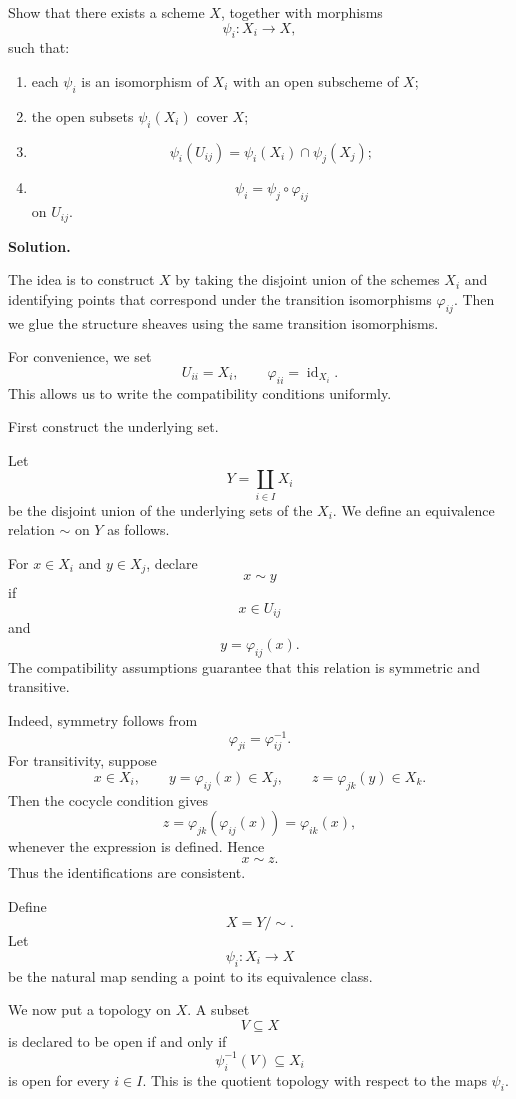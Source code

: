 \documentclass[12pt,a4paper]{article}
\theoremstyle{notespace}
\begin{document}
Show that there exists a scheme \(X\), together with morphisms
\[
\psi_i:X_i\to X,
\]
such that:

\begin{enumerate}[label=\textup{(\arabic*)}]
	\item each \(\psi_i\) is an isomorphism of \(X_i\) with an open subscheme of \(X\);
	
	\item the open subsets \(\psi_i(X_i)\) cover \(X\);
	
	\item
	\[
	\psi_i(U_{ij})
	=
	\psi_i(X_i)\cap \psi_j(X_j);
	\]
	
	\item
	\[
	\psi_i
	=
	\psi_j\circ \varphi_{ij}
	\]
	on \(U_{ij}\).
\end{enumerate}

\textbf{Solution.}

The idea is to construct \(X\) by taking the disjoint union of the schemes \(X_i\) and identifying points that correspond under the transition isomorphisms \(\varphi_{ij}\). Then we glue the structure sheaves using the same transition isomorphisms.

For convenience, we set
\[
U_{ii}=X_i,
\qquad
\varphi_{ii}=\operatorname{id}_{X_i}.
\]
This allows us to write the compatibility conditions uniformly.

First construct the underlying set.

Let
\[
Y=\coprod_{i\in I}X_i
\]
be the disjoint union of the underlying sets of the \(X_i\). We define an equivalence relation \(\sim\) on \(Y\) as follows.

For \(x\in X_i\) and \(y\in X_j\), declare
\[
x\sim y
\]
if
\[
x\in U_{ij}
\]
and
\[
y=\varphi_{ij}(x).
\]
The compatibility assumptions guarantee that this relation is symmetric and transitive.

Indeed, symmetry follows from
\[
\varphi_{ji}=\varphi_{ij}^{-1}.
\]
For transitivity, suppose
\[
x\in X_i,
\qquad
y=\varphi_{ij}(x)\in X_j,
\qquad
z=\varphi_{jk}(y)\in X_k.
\]
Then the cocycle condition gives
\[
z
=
\varphi_{jk}(\varphi_{ij}(x))
=
\varphi_{ik}(x),
\]
whenever the expression is defined. Hence
\[
x\sim z.
\]
Thus the identifications are consistent.

Define
\[
X=Y/{\sim}.
\]
Let
\[
\psi_i:X_i\to X
\]
be the natural map sending a point to its equivalence class.

We now put a topology on \(X\). A subset
\[
V\subseteq X
\]
is declared to be open if and only if
\[
\psi_i^{-1}(V)\subseteq X_i
\]
is open for every \(i\in I\). This is the quotient topology with respect to the maps \(\psi_i\).
\end{document}
